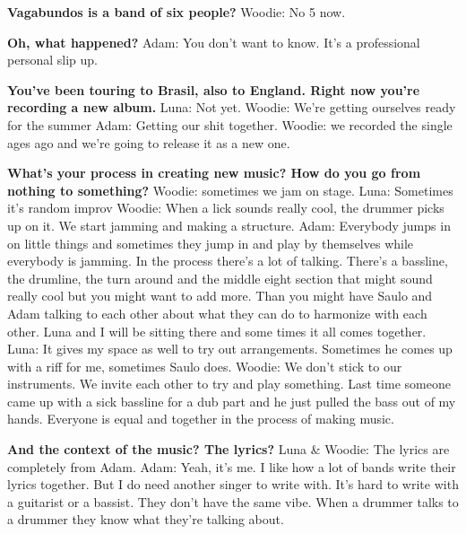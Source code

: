 \textbf{Vagabundos is a band of six people?}
\newline Woodie: No 5 now.

\textbf{Oh, what happened?}
\newline Adam: You don't want to know. It's a professional personal slip up.

\textbf{You've been touring to Brasil, also to England. Right now you're recording a new album.}
\newline Luna: Not yet.
\newline Woodie: We're getting ourselves ready for the summer
\newline Adam: Getting our shit together.
\newline Woodie: we recorded the single ages ago and we're going to release it as a new one.

\textbf{What's your process in creating new music? How do you go from nothing to something?}
\newline Woodie: sometimes we jam on stage.
\newline Luna: Sometimes it's random improv
\newline Woodie: When a lick sounds really cool, the drummer picks up on it. We start jamming and making a structure.
\newline Adam: Everybody jumps in on little things and sometimes they jump in and play by themselves while everybody is jamming.
In the process there's a lot of talking. There's a bassline, the drumline, the turn around and the middle eight section that might sound really cool but you might want to add more.
Than you might have Saulo and Adam talking to each other about what they can do to harmonize with each other.
Luna and I will be sitting there and some times it all comes together.
\newline Luna: It gives my space as well to try out arrangements. Sometimes he comes up with a riff for me, sometimes Saulo does.
\newline Woodie: We don't stick to our instruments. We invite each other to try and play something. Last time someone came up with a sick bassline for a dub part and he just pulled the bass out of my hands.
Everyone is equal and together in the process of making music.

\textbf{And the context of the music? The lyrics?}
\newline Luna \& Woodie: The lyrics are completely from Adam.
\newline Adam: Yeah, it's me. I like how a lot of bands write their lyrics together. But I do need another singer to write with. It's hard to write with a guitarist or a bassist.
They don't have the same vibe. When a drummer talks to a drummer they know what they're talking about.


